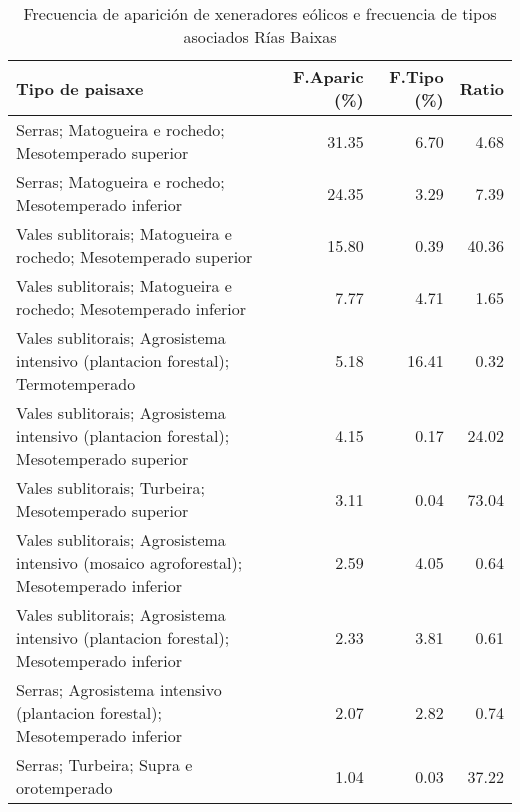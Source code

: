 \begin{table}[p]
\centering
\caption{Frecuencia de aparición de xeneradores eólicos e frecuencia de tipos asociados Rías Baixas} 
\label{veolico12}
\begin{tabular}{lrrr}
  \hline
Tipo de paisaxe & F.Aparic (\%) & F.Tipo (\%) & Ratio \\ 
  \hline
Serras; Matogueira e rochedo; Mesotemperado superior & 31.35 & 6.70 & 4.68 \\ 
  Serras; Matogueira e rochedo; Mesotemperado inferior & 24.35 & 3.29 & 7.39 \\ 
  Vales sublitorais; Matogueira e rochedo; Mesotemperado superior & 15.80 & 0.39 & 40.36 \\ 
  Vales sublitorais; Matogueira e rochedo; Mesotemperado inferior & 7.77 & 4.71 & 1.65 \\ 
  Vales sublitorais; Agrosistema intensivo (plantacion forestal); Termotemperado & 5.18 & 16.41 & 0.32 \\ 
  Vales sublitorais; Agrosistema intensivo (plantacion forestal); Mesotemperado superior & 4.15 & 0.17 & 24.02 \\ 
  Vales sublitorais; Turbeira; Mesotemperado superior & 3.11 & 0.04 & 73.04 \\ 
  Vales sublitorais; Agrosistema intensivo (mosaico agroforestal); Mesotemperado inferior & 2.59 & 4.05 & 0.64 \\ 
  Vales sublitorais; Agrosistema intensivo (plantacion forestal); Mesotemperado inferior & 2.33 & 3.81 & 0.61 \\ 
  Serras; Agrosistema intensivo (plantacion forestal); Mesotemperado inferior & 2.07 & 2.82 & 0.74 \\ 
  Serras; Turbeira; Supra e orotemperado & 1.04 & 0.03 & 37.22 \\ 
   \hline
\end{tabular}
\end{table}
